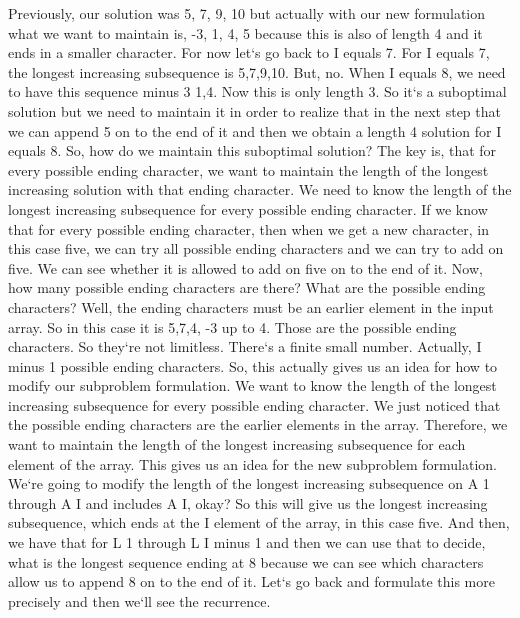 Previously, our solution was 5, 7, 9, 10 but actually with our new formulation what we want to maintain is, -3, 1, 4, 5 because this is also of length 4 and it ends in a smaller character.
For now let`s go back to I equals 7.
For I equals 7, the longest increasing subsequence is 5,7,9,10.
But, no.
When I equals 8, we need to have this sequence minus 3 1,4.
Now this is only length 3.
So it`s a suboptimal solution but we need to maintain it in order to realize that in the next step that we can append 5 on to the end of it and then we obtain a length 4 solution for I equals 8.
So, how do we maintain this suboptimal solution? The key is, that for every possible ending character, we want to maintain the length of the longest increasing solution with that ending character.
We need to know the length of the longest increasing subsequence for every possible ending character.
If we know that for every possible ending character, then when we get a new character, in this case five, we can try all possible ending characters and we can try to add on five.
We can see whether it is allowed to add on five on to the end of it.
Now, how many possible ending characters are there? What are the possible ending characters? Well, the ending characters must be an earlier element in the input array.
So in this case it is 5,7,4, -3 up to 4.
Those are the possible ending characters.
So they`re not limitless.
There`s a finite small number.
Actually, I minus 1 possible ending characters.
So, this actually gives us an idea for how to modify our subproblem formulation.
We want to know the length of the longest increasing subsequence for every possible ending character.
We just noticed that the possible ending characters are the earlier elements in the array.
Therefore, we want to maintain the length of the longest increasing subsequence for each element of the array.
This gives us an idea for the new subproblem formulation.
We`re going to modify the length of the longest increasing subsequence on A 1 through A I and includes A I, okay? So this will give us the longest increasing subsequence, which ends at the I element of the array, in this case five.
And then, we have that for L 1 through L I minus 1 and then we can use that to decide, what is the longest sequence ending at 8 because we can see which characters allow us to append 8 on to the end of it.
Let`s go back and formulate this more precisely and then we`ll see the recurrence.

